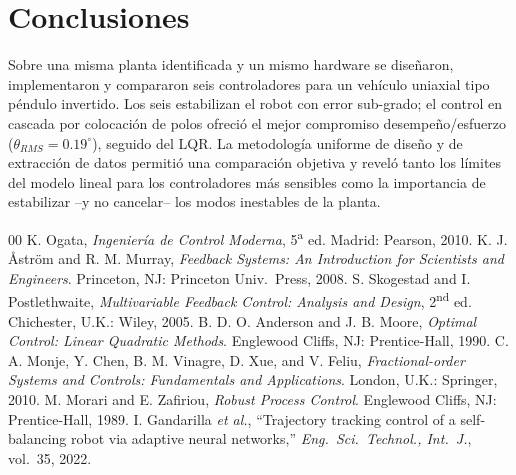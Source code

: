 \documentclass[conference]{IEEEtran}
\begin{document}
\section{Conclusiones}
Sobre una misma planta identificada y un mismo hardware se dise\~naron,
implementaron y compararon seis controladores para un veh\'iculo uniaxial tipo
p\'endulo invertido. Los seis estabilizan el robot con error sub-grado; el control
en cascada por colocaci\'on de polos ofreci\'o el mejor compromiso
desempe\~no/esfuerzo ($\theta_{RMS}=0.19^\circ$), seguido del LQR. La metodolog\'ia
uniforme de dise\~no y de extracci\'on de datos permiti\'o una comparaci\'on
objetiva y revel\'o tanto los l\'imites del modelo lineal para los controladores
m\'as sensibles como la importancia de estabilizar --y no cancelar-- los modos
inestables de la planta.

\begin{thebibliography}{00}
 K. Ogata, \textit{Ingenier\'ia de Control Moderna}, 5\textsuperscript{a} ed. Madrid: Pearson, 2010.
 K. J. \r{A}str\"om and R. M. Murray, \textit{Feedback Systems: An Introduction for Scientists and Engineers}. Princeton, NJ: Princeton Univ.\ Press, 2008.
 S. Skogestad and I. Postlethwaite, \textit{Multivariable Feedback Control: Analysis and Design}, 2\textsuperscript{nd} ed. Chichester, U.K.: Wiley, 2005.
 B. D. O. Anderson and J. B. Moore, \textit{Optimal Control: Linear Quadratic Methods}. Englewood Cliffs, NJ: Prentice-Hall, 1990.
 C. A. Monje, Y. Chen, B. M. Vinagre, D. Xue, and V. Feliu, \textit{Fractional-order Systems and Controls: Fundamentals and Applications}. London, U.K.: Springer, 2010.
 M. Morari and E. Zafiriou, \textit{Robust Process Control}. Englewood Cliffs, NJ: Prentice-Hall, 1989.
 I. Gandarilla \textit{et al.}, ``Trajectory tracking control of a self-balancing robot via adaptive neural networks,'' \textit{Eng.\ Sci.\ Technol., Int.\ J.}, vol.\ 35, 2022.
\end{thebibliography}
\end{document}
